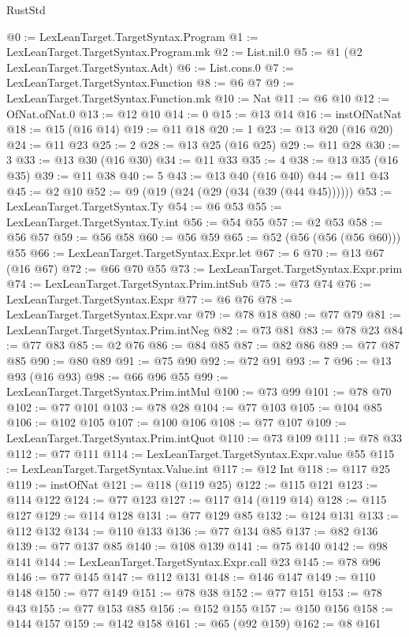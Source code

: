 \begin{lexlean}{RustStd}
\begin{coremodule}
@0 := LexLeanTarget.TargetSyntax.Program
@1 := LexLeanTarget.TargetSyntax.Program.mk
@2 := List.nil.{0}
@5 := @1 (@2 LexLeanTarget.TargetSyntax.Adt)
@6 := List.cons.{0}
@7 := LexLeanTarget.TargetSyntax.Function
@8 := @6 @7
@9 := LexLeanTarget.TargetSyntax.Function.mk
@10 := Nat
@11 := @6 @10
@12 := OfNat.ofNat.{0}
@13 := @12 @10
@14 := 0
@15 := @13 @14
@16 := instOfNatNat
@18 := @15 (@16 @14)
@19 := @11 @18
@20 := 1
@23 := @13 @20 (@16 @20)
@24 := @11 @23
@25 := 2
@28 := @13 @25 (@16 @25)
@29 := @11 @28
@30 := 3
@33 := @13 @30 (@16 @30)
@34 := @11 @33
@35 := 4
@38 := @13 @35 (@16 @35)
@39 := @11 @38
@40 := 5
@43 := @13 @40 (@16 @40)
@44 := @11 @43
@45 := @2 @10
@52 := @9 (@19 (@24 (@29 (@34 (@39 (@44 @45))))))
@53 := LexLeanTarget.TargetSyntax.Ty
@54 := @6 @53
@55 := LexLeanTarget.TargetSyntax.Ty.int
@56 := @54 @55
@57 := @2 @53
@58 := @56 @57
@59 := @56 @58
@60 := @56 @59
@65 := @52 (@56 (@56 (@56 @60))) @55
@66 := LexLeanTarget.TargetSyntax.Expr.let
@67 := 6
@70 := @13 @67 (@16 @67)
@72 := @66 @70 @55
@73 := LexLeanTarget.TargetSyntax.Expr.prim
@74 := LexLeanTarget.TargetSyntax.Prim.intSub
@75 := @73 @74
@76 := LexLeanTarget.TargetSyntax.Expr
@77 := @6 @76
@78 := LexLeanTarget.TargetSyntax.Expr.var
@79 := @78 @18
@80 := @77 @79
@81 := LexLeanTarget.TargetSyntax.Prim.intNeg
@82 := @73 @81
@83 := @78 @23
@84 := @77 @83
@85 := @2 @76
@86 := @84 @85
@87 := @82 @86
@89 := @77 @87 @85
@90 := @80 @89
@91 := @75 @90
@92 := @72 @91
@93 := 7
@96 := @13 @93 (@16 @93)
@98 := @66 @96 @55
@99 := LexLeanTarget.TargetSyntax.Prim.intMul
@100 := @73 @99
@101 := @78 @70
@102 := @77 @101
@103 := @78 @28
@104 := @77 @103
@105 := @104 @85
@106 := @102 @105
@107 := @100 @106
@108 := @77 @107
@109 := LexLeanTarget.TargetSyntax.Prim.intQuot
@110 := @73 @109
@111 := @78 @33
@112 := @77 @111
@114 := LexLeanTarget.TargetSyntax.Expr.value @55
@115 := LexLeanTarget.TargetSyntax.Value.int
@117 := @12 Int
@118 := @117 @25
@119 := instOfNat
@121 := @118 (@119 @25)
@122 := @115 @121
@123 := @114 @122
@124 := @77 @123
@127 := @117 @14 (@119 @14)
@128 := @115 @127
@129 := @114 @128
@131 := @77 @129 @85
@132 := @124 @131
@133 := @112 @132
@134 := @110 @133
@136 := @77 @134 @85
@137 := @82 @136
@139 := @77 @137 @85
@140 := @108 @139
@141 := @75 @140
@142 := @98 @141
@144 := LexLeanTarget.TargetSyntax.Expr.call @23
@145 := @78 @96
@146 := @77 @145
@147 := @112 @131
@148 := @146 @147
@149 := @110 @148
@150 := @77 @149
@151 := @78 @38
@152 := @77 @151
@153 := @78 @43
@155 := @77 @153 @85
@156 := @152 @155
@157 := @150 @156
@158 := @144 @157
@159 := @142 @158
@161 := @65 (@92 @159)
@162 := @8 @161

\end{coremodule}
\end{lexlean}
